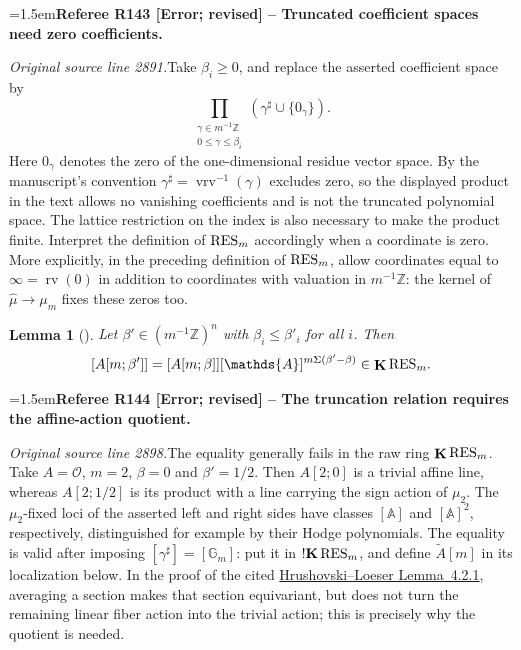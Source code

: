 \documentclass[12pt]{amsart}
\newcommand{\RefereeRemark}[4]{%
  \par\medskip\begingroup\normalfont\small\color{RefereePurple}%
  \emergencystretch=1.5em\noindent\textbf{Referee R#1 [#2] -- #3.}\par\nobreak\noindent #4\par
  \endgroup\medskip
}
\theoremstyle{plain}
\newtheorem{lem}[thm]{Lemma}
\theoremstyle{definition}
\theoremstyle{remark}
\numberwithin{equation}{section}
\theoremstyle{plain}
\newcommand{\OO}{\mdl O}
\newcommand{\Z}{\mathds{Z}}
\newcommand{\A}{\mathds{A}}
\newcommand{\G}{\mathds{G}}
\newcommand{\0}{\emptyset}
\newcommand{\mdl}[1]{\mathcal{#1}}  %
\newcommand{\RES}{\textup{RES}}
\DeclareMathOperator{\rv}{rv}
\DeclareMathOperator{\ggk}{\mathbf{K}}
\DeclareMathOperator{\sggk}{!\mathbf{K}}
\DeclareMathOperator{\vrv}{vrv}
\begin{document}
\RefereeRemark{143}{Error; revised}{Truncated coefficient spaces need zero coefficients}{%
\textit{Original source line 2891.}\quad Take $\beta_i\geq0$, and replace the asserted coefficient space by
\[
 \prod_{\substack{\gamma\in m^{-1}\Z\\0\leq\gamma\leq\beta_i}}
       (\gamma^\sharp\cup\{0_\gamma\}).
\]
Here $0_\gamma$ denotes the zero of the one-dimensional residue vector space. By the manuscript's convention $\gamma^\sharp=\vrv^{-1}(\gamma)$ excludes zero, so the displayed product in the text allows no vanishing coefficients and is not the truncated polynomial space. The lattice restriction on the index is also necessary to make the product finite. Interpret the definition of $\RES_m$ accordingly when a coordinate is zero. More explicitly, in the preceding definition of $\RES_m$, allow coordinates equal to $\infty=\rv(0)$ in addition to coordinates with valuation in $m^{-1}\Z$: the kernel of $\hat\mu\to\mu_m$ fixes these zeros too.
}

\begin{lem}[{\cite[Lemma~4.2.1]{hru:loe:lef}}]
Let $\beta' \in (m^{-1} \Z)^n$ with $\beta_i \leq \beta'_i$ for all $i$. Then
\begin{equation}\label{arc:com}
  [A[m;\beta']] = [A[m;\beta]][\A]^{m \Sigma (\beta' - \beta)} \in \ggk \RES_{m}.
\end{equation}
\end{lem}

\RefereeRemark{144}{Error; revised}{The truncation relation requires the affine-action quotient}{%
\textit{Original source line 2898.}\quad The equality generally fails in the raw ring $\ggk\RES_m$. Take $A=\OO$, $m=2$, $\beta=0$ and $\beta'=1/2$. Then $A[2;0]$ is a trivial affine line, whereas $A[2;1/2]$ is its product with a line carrying the sign action of $\mu_2$. The $\mu_2$-fixed loci of the asserted left and right sides have classes $[\A]$ and $[\A]^2$, respectively, distinguished for example by their Hodge polynomials. The equality is valid after imposing $[\gamma^\sharp]=[\G_m]$: put it in $\sggk\RES_m$, and define $\tilde A[m]$ in its localization below. In the proof of the cited \href{https://arxiv.org/pdf/1111.1954}{Hrushovski--Loeser Lemma~4.2.1}, averaging a section makes that section equivariant, but does not turn the remaining linear fiber action into the trivial action; this is precisely why the quotient is needed.
}
\end{document}
